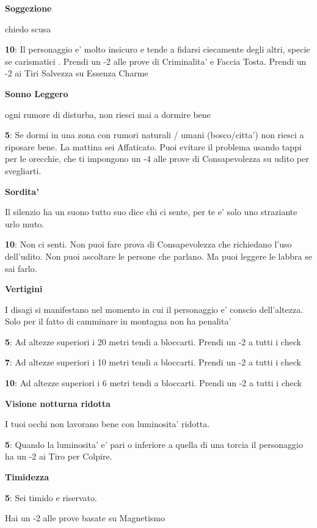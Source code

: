 \documentclass[a4paper,11pt,twoside,openany]{book}
\begin{document}
{		\textbf{Soggezione}
		
		chiedo scusa
		
		\textbf{10}: Il personaggio e' molto insicuro e tende a fidarsi ciecamente degli altri, specie se carismatici . Prendi un -2 alle prove di Criminalita' e Faccia Tosta.
		Prendi un -2 ai Tiri Salvezza su Essenza Charme
		
		\textbf{Sonno Leggero}
		
		ogni rumore di disturba, non riesci mai a dormire bene
		
		\textbf{5}: Se dormi in una zona con rumori naturali / umani (bosco/citta') non riesci a riposare bene. La mattina sei Affaticato. Puoi evitare il problema usando tappi per le orecchie, che ti impongono un -4 alle prove di Consapevolezza su udito per svegliarti.
		
		\textbf{Sordita'}
		
		Il silenzio ha un suono tutto suo dice chi ci sente, per te e' solo uno straziante urlo muto.
		
		\textbf{10}: Non ci senti. Non puoi fare prova di Consapevolezza che richiedano l'uso dell'udito. Non puoi ascoltare le persone che parlano. Ma puoi leggere le labbra se sai farlo.
		
		\textbf{Vertigini}
		
		I disagi si manifestano nel momento in cui il personaggio e' conscio dell'altezza. Solo per il fatto di camminare in montagna non ha penalita'
		
		\textbf{5}: Ad altezze superiori i 20 metri tendi a bloccarti. Prendi un -2 a tutti i check
		
		\textbf{7}: Ad altezze superiori i 10 metri tendi a bloccarti. Prendi un -2 a tutti i check
		
		\textbf{10}: Ad altezze superiori i 6 metri tendi a bloccarti. Prendi un -2 a tutti i check
		
		\textbf{Visione notturna ridotta}
		
		I tuoi occhi non lavorano bene con luminosita' ridotta.
		
		\textbf{5}: Quando la luminosita' e' pari o inferiore a quella di una torcia il personaggio ha un -2 ai Tiro per Colpire.
		
		\textbf{Timidezza}
		
		\textbf{5}: Sei timido e riservato.
		
		Hai un -2 alle prove basate su Magnetismo
		
}
\end{document}
